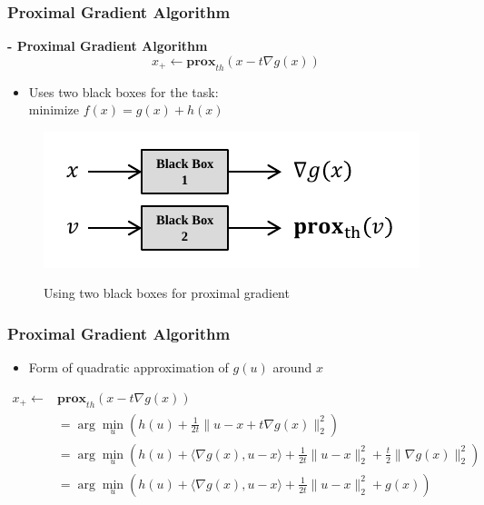 \documentclass{beamer}
\begin{document}
\begin{frame}
\frametitle{Proximal Gradient Algorithm}
\noindent\textbf{- Proximal Gradient Algorithm}\\
\begin{equation*}
x_+ \leftarrow \textbf{prox}_{th} \left(x - t\nabla g(x) \right)
\end{equation*}
\begin{itemize}
\item Uses two black boxes for the task:\\
\centering minimize $f(x) = g(x) + h(x)$
\end{itemize}
\begin{figure}[ht]
    \centering
    \includegraphics[scale=0.9]{L16_fig_twoblackboxes}\\
    \caption{Using two black boxes for proximal gradient}\label{16fig:twoblackboxes}
\end{figure}
\end{frame}

\begin{frame}
\frametitle{Proximal Gradient Algorithm}
\begin{itemize}
\item Form of quadratic approximation of $g(u)$ around $x$
\end{itemize}
\begin{align}
x_+ \leftarrow &\textbf{prox}_{th} \left(x - t\nabla g(x) \right)\nonumber\\
&= \arg\min_u \left( h(u)+\frac{1}{2t}\|u-x+t\nabla g(x)\|_2^2 \right)\nonumber\\
&= \arg\min_u \left( h(u)+\langle \nabla g(x), u-x \rangle + \frac{1}{2t}\|u-x\|_2^2 +\frac{t}{2}\| \nabla g(x) \|_2^2 \right)\nonumber\\
&= \arg\min_u \left( h(u)+\langle \nabla g(x), u-x \rangle + \frac{1}{2t}\|u-x\|_2^2 + g(x) \right)
\end{align}\label{16eq:prox_quadratic}

\end{frame}
\end{document}
